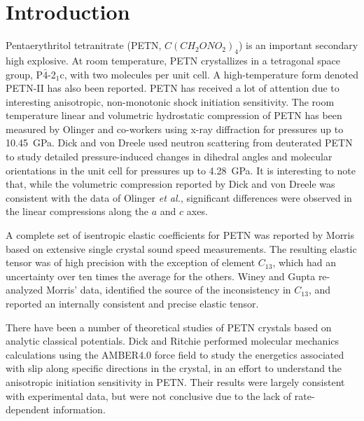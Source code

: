 \documentclass[prb,aps,nobibnotes,twocolumn,doublespace,twocolumngrid,superbib]{revtex4}
\begin{document}
\section{Introduction}
Pentaerythritol tetranitrate (PETN, $C(CH_2ONO_2)_4$) is an important 
secondary high explosive.
 At room temperature, PETN crystallizes in a 
tetragonal space group, P$\bar{4}$-2$_1$c,  
with two molecules per unit
cell\cite{Booth_1947v,Trotter_1963v16,Conant_1979}.
A high-temperature 
form denoted PETN-II has also been reported\cite{Cady_1975vB41}.  
PETN has received a lot of attention due to interesting anisotropic, 
non-monotonic shock initiation 
sensitivity\cite{Dick_1984v44,Dick_1991v70,Gallagher_1992v339,Dick_1997v81,Gruzdkov_2000v104,Yoo_2000v88}.
The room temperature linear and volumetric hydrostatic compression
of PETN has been measured by Olinger and 
co-workers\cite{Olinger_1975v62,Olinger_1976} 
using x-ray diffraction for pressures up to 10.45~GPa. 
Dick and von Dreele\cite{Dick_1997} used neutron scattering from deuterated
PETN to study detailed pressure-induced changes in dihedral angles and
molecular orientations in the unit cell for pressures up to 4.28~GPa. 
It is interesting to note that, while the volumetric compression reported
by Dick and von Dreele was consistent with the data of Olinger {\it et al.},
significant differences were observed in the linear compressions along
the $a$ and $c$ axes.

A complete set of isentropic elastic coefficients for PETN was reported 
by Morris\cite{Morris_1976} based on
extensive single crystal sound speed measurements.  The resulting
elastic tensor was of high precision with the exception of element $C_{13}$,
which had an uncertainty over ten times the average for the others.
Winey and Gupta\cite{Winey_2001v90} 
re-analyzed Morris' data, identified the source of the inconsistency in 
$C_{13}$, and reported an internally consistent and precise elastic tensor.

There have been a number of theoretical studies of PETN crystals
based on analytic classical potentials.
Dick and Ritchie\cite{Dick_1994v76}
performed molecular 
mechanics calculations using the AMBER4.0 force field to study the energetics 
associated with slip along specific directions in the crystal, in an effort 
to understand the anisotropic initiation sensitivity in PETN.  Their results 
were largely consistent with experimental data, but were not conclusive due 
to the lack of rate-dependent information.  
\end{document}
